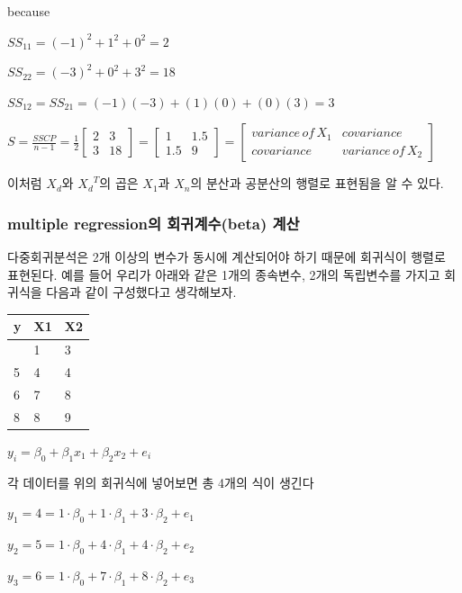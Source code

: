 \documentclass[
]{book}
\begin{document}
because

\(SS_{11}=(-1)^2+1^2+0^2=2\)

\(SS_{22}=(-3)^2+0^2+3^2=18\)

\(SS_{12}=SS_{21}=(-1)(-3)+(1)(0)+(0)(3)=3\)

\(S=\frac{SSCP}{n-1}=\frac{1}{2}\begin{bmatrix}
2 & 3\\
3 & 18
\end{bmatrix}=\begin{bmatrix}
1 & 1.5\\
1.5 & 9
\end{bmatrix}=\begin{bmatrix}
variance\, of \, X_{1} & covariance\\
 covariance&variance\, of\, X_{2}
\end{bmatrix}\)

이처럼 \(X_{d}\)와 \({X_{d}}^T\)의 곱은 \(X_{1}\)과 \(X_{n}\)의 분산과 공분산의 행렬로 표현됨을 알 수 있다.

\subsubsection{multiple regression의 회귀계수(beta) 계산}\label{multiple-regressionuxc758-uxd68cuxadc0uxacc4uxc218beta-uxacc4uxc0b0}

다중회귀분석은 2개 이상의 변수가 동시에 계산되어야 하기 때문에 회귀식이 행렬로 표현된다. 예를 들어 우리가 아래와 같은 1개의 종속변수, 2개의 독립변수를 가지고 회귀식을 다음과 같이 구성했다고 생각해보자.

\begin{longtable}[]{@{}lll@{}}
\toprule\noalign{}
y & X1 & X2 \\
\midrule\noalign{}
\endhead
\bottomrule\noalign{}
\endlastfoot
4 & 1 & 3 \\
5 & 4 & 4 \\
6 & 7 & 8 \\
8 & 8 & 9 \\
\end{longtable}

\(y_{i}=\beta_{0}+\beta_{1}x_{1}+\beta_{2}x_{2}+e_{i}\)

각 데이터를 위의 회귀식에 넣어보면 총 4개의 식이 생긴다

\(y_{1}=4=1\cdot \beta_{0}+1\cdot \beta_{1}+3\cdot \beta_{2}+e_{1}\)

\(y_{2}=5=1\cdot \beta_{0}+4\cdot \beta_{1}+4\cdot \beta_{2}+e_{2}\)

\(y_{3}=6=1\cdot \beta_{0}+7\cdot \beta_{1}+8\cdot \beta_{2}+e_{3}\)
\end{document}
